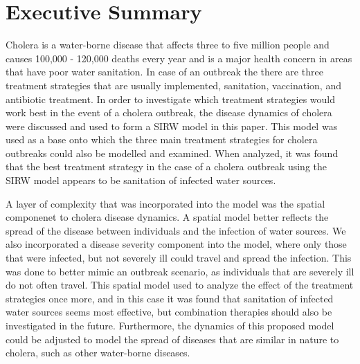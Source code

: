 \section*{Executive Summary}
\par Cholera is a water-borne disease  that affects three to five million people and causes 100,000 - 120,000 deaths every year and is a major health concern in areas that have poor water sanitation. In case of an outbreak the there are three treatment strategies that are usually implemented, sanitation, vaccination, and antibiotic treatment. In order to investigate which treatment strategies would work best in the event of a cholera outbreak, the disease dynamics of cholera were discussed and used to form a SIRW model in this paper. This model was used as a base onto which the three main treatment strategies for cholera outbreaks could also be modelled and examined. When analyzed, it was found that the best treatment strategy in the case of a cholera outbreak using the SIRW model appears to be sanitation of infected water sources.
\par A layer of complexity that was incorporated into the model was the spatial componenet to cholera disease dynamics. A spatial model better reflects the spread of the disease between individuals and the infection of water sources. We also incorporated a disease severity component into the model, where only those that were infected, but not severely ill could travel and spread the infection. This was done to better mimic an outbreak scenario, as individuals that are severely ill do not often travel. This spatial model used to analyze the effect of the treatment strategies once more, and in this case it was found that sanitation of infected water sources seems most effective, but combination therapies should also be investigated in the future. Furthermore, the dynamics of this proposed model could be adjusted to model the spread of diseases that are similar in nature to cholera, such as other water-borne diseases.
